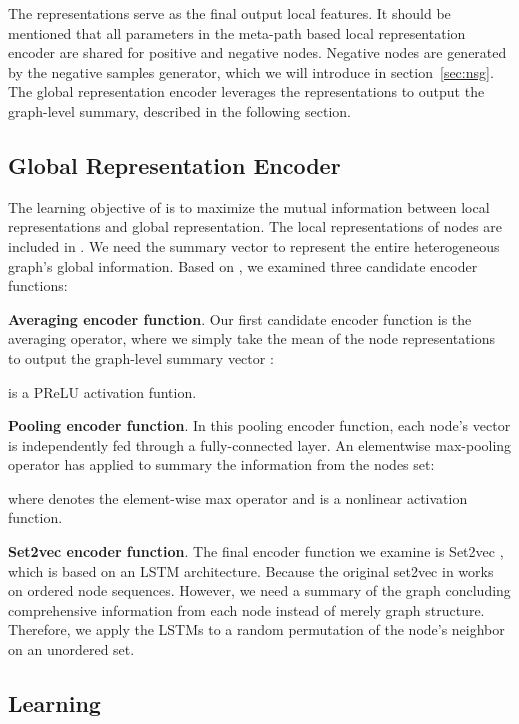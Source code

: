 \documentclass[conference]{IEEEtran}
\begin{document}
	The representations  serve as the final output local features. 
	It should be mentioned that all parameters in the meta-path based local representation encoder are shared for positive and negative nodes. Negative nodes are generated by the negative samples generator, which we will introduce in section~\ref{sec:nsg}. 
	The global representation encoder leverages the representations  to output the graph-level summary, described in the following section.
	
\subsection{Global Representation Encoder}\label{sec:global}
The learning objective of {\our} is to maximize the mutual information between local representations and global representation. The local representations of nodes are included in . We need the summary vector  to represent the entire heterogeneous graph's global information. Based on , we examined three candidate encoder functions:
	
	\noindent
	\textbf{Averaging encoder function}. Our first candidate encoder function is the averaging operator, where we simply
	take the mean of the node representations to output the graph-level summary vector :
	

 is a PReLU activation funtion.
	\noindent
	
	
	\noindent
	\textbf{Pooling encoder function}. In this pooling encoder function, each node's vector is independently fed through a fully-connected layer. An elementwise max-pooling operator has applied to summary the information from the nodes set:

\noindent
	where  denotes the element-wise max operator and  is a nonlinear activation function.
	
	\noindent
	\textbf{Set2vec encoder function}. The final encoder function we examine is Set2vec \cite{VBK16}, which is based on an LSTM architecture. 
Because the original set2vec in \cite{VBK16} works on ordered node sequences. However, we need a summary of the graph concluding comprehensive information from each node instead of merely graph structure. Therefore, we apply the LSTMs to a random permutation of the node's neighbor on an unordered set.
	
\subsection{{\our} Learning}\label{sec:learning}
\end{document}
